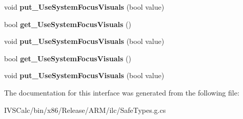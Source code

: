 \begin{DoxyCompactItemize}
void {\bfseries put\+\_\+\+Use\+System\+Focus\+Visuals} (bool value)
\item 
\mbox{\label{interface_windows_1_1_u_i_1_1_xaml_1_1_controls_1_1_i_control3_aa47f942ff2b73dce0f3e647ba53bdc5f}} 
bool {\bfseries get\+\_\+\+Use\+System\+Focus\+Visuals} ()
\item 
\mbox{\label{interface_windows_1_1_u_i_1_1_xaml_1_1_controls_1_1_i_control3_a996aa5f650370b03c915133cfc32fdfe}} 
void {\bfseries put\+\_\+\+Use\+System\+Focus\+Visuals} (bool value)
\item 
\mbox{\label{interface_windows_1_1_u_i_1_1_xaml_1_1_controls_1_1_i_control3_aa47f942ff2b73dce0f3e647ba53bdc5f}} 
bool {\bfseries get\+\_\+\+Use\+System\+Focus\+Visuals} ()
\item 
\mbox{\label{interface_windows_1_1_u_i_1_1_xaml_1_1_controls_1_1_i_control3_a996aa5f650370b03c915133cfc32fdfe}} 
void {\bfseries put\+\_\+\+Use\+System\+Focus\+Visuals} (bool value)
\end{DoxyCompactItemize}


The documentation for this interface was generated from the following file\+:\begin{DoxyCompactItemize}
\item 
I\+V\+S\+Calc/bin/x86/\+Release/\+A\+R\+M/ilc/Safe\+Types.\+g.\+cs\end{DoxyCompactItemize}
